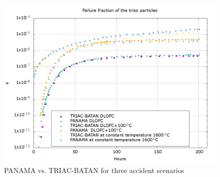 \documentclass[a4paper,11pt]{report}
\begin{document}
\begin{figure}[h!]
  \begin{center}
    \includegraphics[scale=.35]{pics/compareinit.png}
    \caption{PANAMA vs. TRIAC-BATAN for three accident scenarios}
    \label{fig:compareinit}
  \end{center}
\end{figure}




\begin{appendix}
	
	\setcounter{page}{2}
	
\end{appendix}
\end{document}
